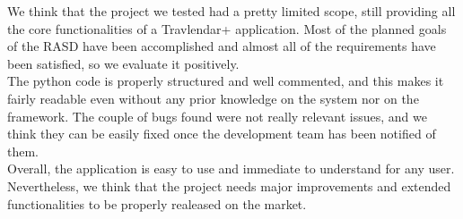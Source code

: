 We think that the project we tested had a pretty limited scope, still providing all the core functionalities of a Travlendar+ application. Most of the planned goals of the RASD have been accomplished and almost all of the requirements have been satisfied, so we evaluate it positively. \\
The python code is properly structured and well commented, and this makes it fairly readable even without any prior knowledge on the system nor on the framework. The couple of bugs found were not really relevant issues, and we think they can be easily fixed once the development team has been notified of them. \\
Overall, the application is easy to use and immediate to understand for any user. Nevertheless, we think that the project needs major improvements and extended functionalities to be properly realeased on the market.